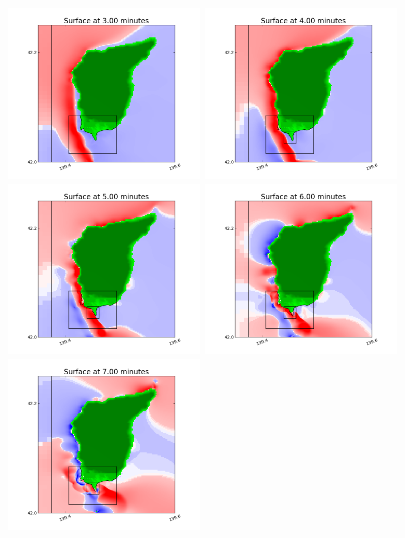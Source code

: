 \begin{figure}[ht]
\hfil\includegraphics[width=2.0in]{bp9/ok_3min.png}\hfil
\hfil\includegraphics[width=2.0in]{bp9/ok_4min.png}\hfil
\hfil\includegraphics[width=2.0in]{bp9/ok_5min.png}\hfil
\vskip 10pt
\hfil\includegraphics[width=2.0in]{bp9/ok_6min.png}\hfil
\hfil\includegraphics[width=2.0in]{bp9/ok_7min.png}\hfil

\end{figure}
